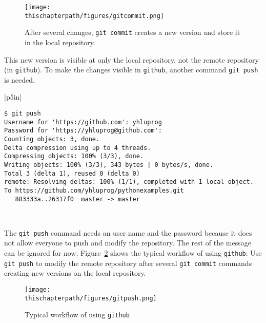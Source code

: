 \begin{figure}[h] \centering
{\texttt{[image: \\thischapterpath/figures/gitcommit.png]}}
\caption{After several changes, {\tt git commit} creates a new version
  and store it in the local repository.}
\label{fig:gitcommit}
\end{figure}

This new version is visible at only the local repository, not the remote
repository (in {\tt github}).  To make the changes visible in {\tt github},
another command {\tt git push} is needed.

\vspace{0.2in}

\noindent
\begin{tabular}{|p{5in}|}\hline
\begin{verbatim}
$ git push
Username for 'https://github.com': yhluprog
Password for 'https://yhluprog@github.com': 
Counting objects: 3, done.
Delta compression using up to 4 threads.
Compressing objects: 100% (3/3), done.
Writing objects: 100% (3/3), 343 bytes | 0 bytes/s, done.
Total 3 (delta 1), reused 0 (delta 0)
remote: Resolving deltas: 100% (1/1), completed with 1 local object.
To https://github.com/yhluprog/pythonexamples.git
   883333a..26317f0  master -> master
\end{verbatim}
\\ \hline
\end{tabular}
\vspace{0.2in}


The {\tt git push} command needs an user name and the password because
it does not allow everyone to push and modify the repository.  The
rest of the message can be ignored for now.  Figure~\ref{fig:gitpush}
shows the typical workflow of using {\tt github}: Use {\tt git push}
to modify the remote repository after several {\tt git commit}
commands creating new versions on the local repository.

\begin{figure}[h] \centering
{\texttt{[image: \\thischapterpath/figures/gitpush.png]}}
\caption{Typical workflow of using {\tt github}}
\label{fig:gitpush}
\end{figure}

\clearpage

